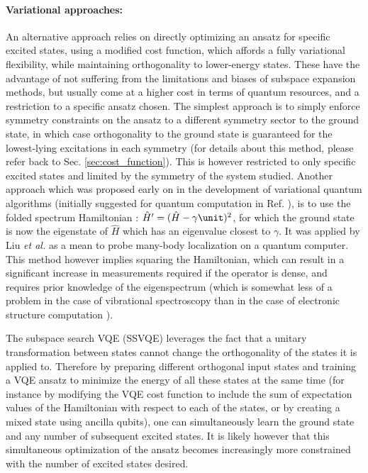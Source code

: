\paragraph{Variational approaches:} An alternative approach relies on directly optimizing an ansatz for specific excited states, using a modified cost function, which affords a fully variational flexibility, while maintaining orthogonality to lower-energy states. These have the advantage of not suffering from the limitations and biases of subspace expansion methods, but usually come at a higher cost in terms of quantum resources, and a restriction to a specific ansatz chosen. The simplest approach is to simply enforce symmetry constraints on the ansatz to a different symmetry sector to the ground state, in which case orthogonality to the ground state is guaranteed for the lowest-lying excitations in each symmetry \cite{Ryabinkin2019} (for details about this method, please refer back to Sec. \ref{sec:cost_function}). This is however restricted to only specific excited states and limited by the symmetry of the system studied. Another approach which was proposed early on in the development of variational quantum algorithms (initially suggested for quantum computation in Ref. \cite{mccleanTheoryVariationalHybrid2015}), is to use the folded spectrum Hamiltonian \cite{Wang1994}: $\hat{H}^{\prime} = (\hat{H} - \gamma \unit)^2 $, for which the ground state is now the eigenstate of $\hat{H}$ which has an eigenvalue closest to $\gamma$. It was applied by Liu \textit{et al.} \cite{Liu2021_MBL} as a mean to probe many-body localization on a quantum computer. This method however implies squaring the Hamiltonian, which can result in a significant increase in measurements required if the operator is dense, and requires prior knowledge of the eigenspectrum (which is somewhat less of a problem in the case of vibrational spectroscopy than in the case of electronic structure computation \cite{Sawaya2021}). 

The subspace search VQE (SSVQE) \cite{nakanishiSubspacesearchVariationalQuantum2019} leverages the fact that a unitary transformation between states cannot change the orthogonality of the states it is applied to. Therefore by preparing different orthogonal input states and training a VQE ansatz to minimize the energy of all these states at the same time (for instance by modifying the VQE cost function to include the sum of expectation values of the Hamiltonian with respect to each of the states, or by creating a mixed state using ancilla qubits), one can simultaneously learn the ground state and any number of subsequent excited states. It is likely however that this simultaneous optimization of the ansatz becomes increasingly more constrained with the number of excited states desired.

